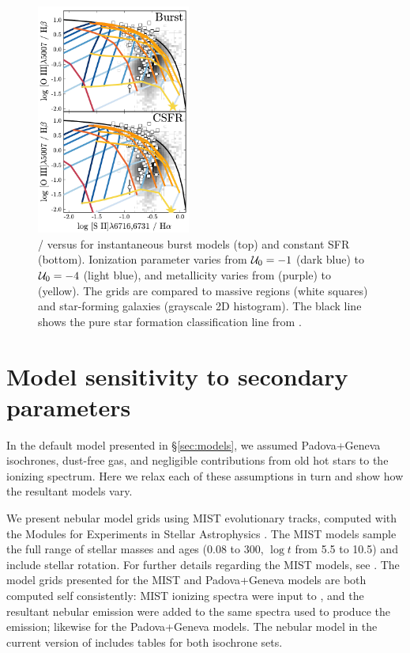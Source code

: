 \begin{figure}[!htbp]
  \begin{centering}
    \includegraphics[width=0.45\textwidth]{manuscript/chapter2/f22.pdf}
    \caption{\sii{}/\ha{} versus \oiiihb{} for instantaneous burst models (top) and constant SFR (bottom). Ionization parameter varies from $\mathcal{U}_{0}=-1$ (dark blue) to $\mathcal{U}_{0}=-4$ (light blue), and metallicity varies from  (purple) to  (yellow). The grids are compared to massive \hii regions (white squares) and star-forming galaxies (grayscale 2D histogram).  The black line shows the pure star formation classification line from \citet{Kauffmann03a}.}
    \label{fig:alt2}
  \end{centering}
\end{figure}

\section{Model sensitivity to secondary parameters}\label{sec:secondary}

In the default model presented in \S\ref{sec:models}, we assumed Padova+Geneva isochrones, dust-free gas, and negligible contributions from old hot stars to the ionizing spectrum. Here we relax each of these assumptions in turn and show how the resultant models vary.

We present nebular model grids using MIST evolutionary tracks, computed with the Modules for Experiments in Stellar Astrophysics \citep[MESA,][]{Paxton11}. The MIST models sample the full range of stellar masses and ages (0.08 to 300\Msun{}, $\log t$ from 5.5 to 10.5) and include stellar rotation. For further details regarding the MIST models, see \citet{Choi16}. The model grids presented for the MIST and Padova+Geneva models are both computed self consistently: MIST ionizing spectra were input to \Cloudy, and the resultant nebular emission were added to the same spectra used to produce the emission; likewise for the Padova+Geneva models. The nebular model in the current version of \FSPS includes tables for both isochrone sets.

